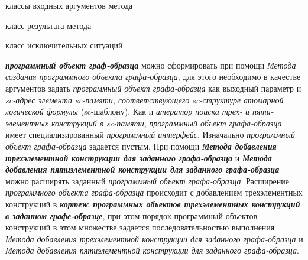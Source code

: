 \begin{SCn}
\begin{scnindent}
\end{scnindent}
\begin{scnrelfromvector}{классы входных аргументов метода}
\end{scnrelfromvector}
\begin{scnrelfromlist}{класс результата метода}
\end{scnrelfromlist}
\begin{scnrelfromlist}{класс исключительных ситуаций}
\end{scnrelfromlist}
\end{SCn}

\textbf{\textit{программный объект граф-образца}} можно сформировать при помощи \textit{Метода создания программного объекта графа-образца}, для этого необходимо в качестве аргументов задать \textit{программный объект графа-образца} как выходный параметр и \textit{sc-адрес элемента sc-памяти, соответствующего sc-структуре} \textit{атомарной логической формулы} (sc-шаблону).
Как и \textit{итератор поиска трех- и пяти- элементных конструкций в sc-памяти}, \textit{программный объект графа-образца} имеет специализированный \textit{программный интерфейс}. Изначально \textit{программный объект графа-образца} задается пустым. При помощи \textbf{\textit{Метода добавления трехэлементной конструкции для заданного графа-образца}} и \textbf{\textit{Метода добавления пятиэлементной конструкции для заданного графа-образца}} можно расширять заданный \textit{программный объект графа-образца}. Расширение \textit{программного объекта графа-образца} происходит с добавлением трехэлементных конструкций в \textbf{\textit{кортеж программных объектов трехэлементных конструкций в заданном графе-образце}}, при этом порядок программный объектов конструкций в этом множестве задается последовательностью выполнения \textit{Метода добавления трехэлементной конструкции для заданного графа-образца} и \textit{Метода добавления пятиэлементной конструкции для заданного графа-образца}.

